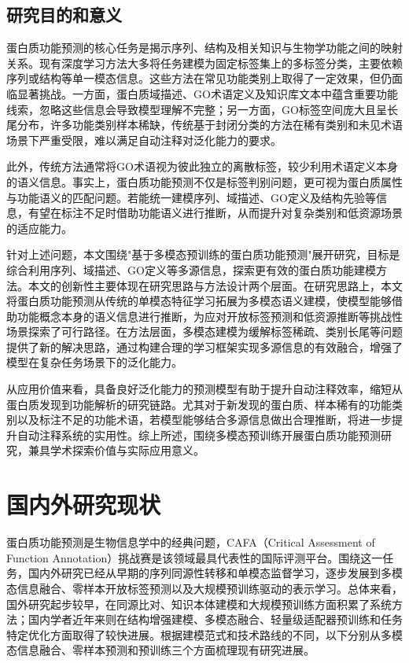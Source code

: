 \subsection{研究目的和意义}

蛋白质功能预测的核心任务是揭示序列、结构及相关知识与生物学功能之间的映射关系。现有深度学习方法大多将任务建模为固定标签集上的多标签分类，主要依赖序列或结构等单一模态信息。这些方法在常见功能类别上取得了一定效果，但仍面临显著挑战。一方面，蛋白质域描述、GO术语定义及知识库文本中蕴含重要功能线索，忽略这些信息会导致模型理解不完整；另一方面，GO标签空间庞大且呈长尾分布，许多功能类别样本稀缺，传统基于封闭分类的方法在稀有类别和未见术语场景下严重受限，难以满足自动注释对泛化能力的要求。

此外，传统方法通常将GO术语视为彼此独立的离散标签，较少利用术语定义本身的语义信息。事实上，蛋白质功能预测不仅是标签判别问题，更可视为蛋白质属性与功能语义的匹配问题。若能统一建模序列、域描述、GO定义及结构先验等信息，有望在标注不足时借助功能语义进行推断，从而提升对复杂类别和低资源场景的适应能力。

针对上述问题，本文围绕"基于多模态预训练的蛋白质功能预测"展开研究，目标是综合利用序列、域描述、GO定义等多源信息，探索更有效的蛋白质功能建模方法。本文的创新性主要体现在研究思路与方法设计两个层面。在研究思路上，本文将蛋白质功能预测从传统的单模态特征学习拓展为多模态语义建模，使模型能够借助功能概念本身的语义信息进行推断，为应对开放标签预测和低资源推断等挑战性场景探索了可行路径。在方法层面，多模态建模为缓解标签稀疏、类别长尾等问题提供了新的解决思路，通过构建合理的学习框架实现多源信息的有效融合，增强了模型在复杂任务场景下的泛化能力。

从应用价值来看，具备良好泛化能力的预测模型有助于提升自动注释效率，缩短从蛋白质发现到功能解析的研究链路。尤其对于新发现的蛋白质、样本稀有的功能类别以及标注不足的功能术语，若模型能够结合多源信息做出合理推断，将进一步提升自动注释系统的实用性。综上所述，围绕多模态预训练开展蛋白质功能预测研究，兼具学术探索价值与实际应用意义。

\section{国内外研究现状}

蛋白质功能预测是生物信息学中的经典问题，CAFA（Critical Assessment of Function Annotation）\cite{zhou2019cafa}挑战赛是该领域最具代表性的国际评测平台。围绕这一任务，国内外研究已经从早期的序列同源性转移和单模态监督学习，逐步发展到多模态信息融合、零样本开放标签预测以及大规模预训练驱动的表示学习。总体来看，国外研究起步较早，在同源比对、知识本体建模和大规模预训练方面积累了系统方法；国内学者近年来则在结构增强建模、多模态融合、轻量级适配器预训练和任务特定优化方面取得了较快进展。根据建模范式和技术路线的不同，以下分别从多模态信息融合、零样本预测和预训练三个方面梳理现有研究进展。

